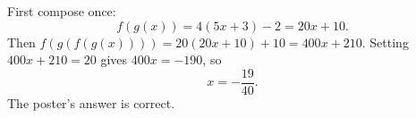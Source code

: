 First compose once:
\[
f(g(x))=4(5x+3)-2=20x+10 .
\]
Then $f(g(f(g(x))))=20(20x+10)+10=400x+210$. Setting $400x+210=20$ gives $400x=-190$, so
\[
x=\boxed{-\dfrac{19}{40}} .
\]
The poster's answer is correct.
